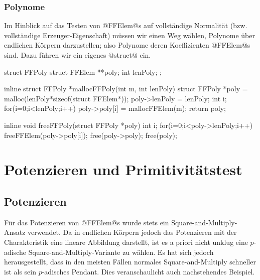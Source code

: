 \subsubsection{Polynome}
Im Hinblick auf das Testen von @FFElem@s auf vollständige Normalität 
(bzw. vollständige Erzeuger-Eigenschaft) müssen wir einen Weg wählen, Polynome
über endlichen Körpern darzustellen; also Polynome deren Koeffizienten 
@FFElem@s sind. Dazu führen wir ein eigenes @struct@ ein.

\begin{ccode}[caption={Aus \url{../Sage/enumeratePCNs.c}},
  firstnumber=144]
struct FFPoly{
    struct FFElem **poly;
    int lenPoly;
};
\end{ccode}


\begin{ccode}[caption={Aus \url{../Sage/enumeratePCNs.c}},
  firstnumber=149]
inline struct FFPoly *mallocFFPoly(int m, int lenPoly){
    struct FFPoly *poly = malloc(lenPoly*sizeof(struct FFElem*));
    poly->lenPoly = lenPoly;
    int i;
    for(i=0;i<lenPoly;i++) poly->poly[i] = mallocFFElem(m);
    return poly;
}
\end{ccode}  

\begin{ccode}[caption={Aus \url{../Sage/enumeratePCNs.c}},
  firstnumber=157]
inline void freeFFPoly(struct FFPoly *poly){
    int i;
    for(i=0;i<poly->lenPoly;i++) freeFFElem(poly->poly[i]);
    free(poly->poly);
    free(poly);
}
\end{ccode}  


\section{Potenzieren und Primitivitätstest}

\subsection{Potenzieren}
Für das Potenzieren von @FFElem@s wurde stets ein Square-and-Multiply-Ansatz
verwendet. Da in endlichen Körpern jedoch das Potenzieren mit der
Charakteristik eine lineare Abbildung darstellt, ist es a priori nicht unklug
eine $p$-adische Square-and-Multiply-Variante zu wählen. Es hat sich jedoch
herausgestellt, dass in den meisten Fällen normales Square-and-Multiply
schneller ist als sein $p$-adisches Pendant. Dies veranschaulicht auch
nachstehendes Beispiel.

